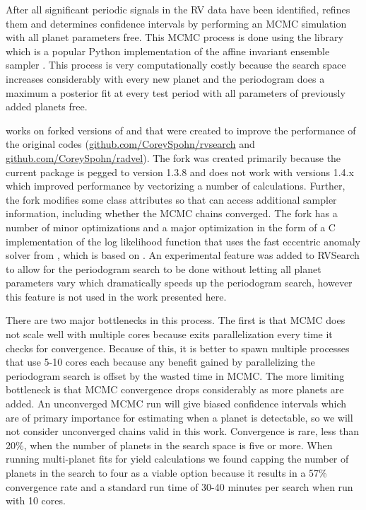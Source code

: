 After all significant periodic signals in the RV data have been identified,
 refines them and determines confidence intervals by performing
an MCMC simulation with all planet parameters free. This MCMC process is done
using the  library \citep{emcee} which is a popular Python
implementation of the affine invariant ensemble sampler \citep{Goodman2010}.
This process is very computationally costly because the search space increases
considerably with every new planet and the periodogram does a maximum a
posterior fit at every test period with all parameters of previously added
planets free.

 works on forked versions of  and
 that were created to improve the performance of the original
codes (\url{github.com/CoreySpohn/rvsearch} and
\url{github.com/CoreySpohn/radvel}). The  fork was created
primarily because the current  package is pegged to
 version 1.3.8 and does not work with  versions 1.4.x
which improved performance by vectorizing a number of calculations. Further,
the fork modifies some class attributes so that  can access
additional sampler information, including whether the MCMC chains converged.
The  fork has a number of minor optimizations and a major
optimization in the form of a C implementation of the log likelihood function
that uses the fast eccentric anomaly solver from 
\citep{brandtOrvaraEfficient2021}, which is based on
\citet{raposo-pulidoEfficientCode2017}. An experimental feature was added to
RVSearch to allow for the periodogram search to be done without letting all
planet parameters vary which dramatically speeds up the periodogram search,
however this feature is not used in the work presented here.

There are two major bottlenecks in this process. The first is that MCMC does
not scale well with multiple cores because  exits parallelization
every time it checks for convergence. Because of this, it is better to spawn
multiple processes that use 5-10 cores each because any benefit gained by
parallelizing the periodogram search is offset by the wasted time in MCMC. The
more limiting bottleneck is that MCMC convergence drops considerably as more
planets are added. An unconverged MCMC run will give biased confidence
intervals which are of primary importance for estimating when a planet is
detectable, so we will not consider unconverged chains valid in this work.
Convergence is rare, less than 20\%, when the number of planets in the search
space is five or more. When running multi-planet fits for yield calculations we
found capping the number of planets in the search to four as a viable option
because it results in a 57\% convergence rate and a standard run time of 30-40
minutes per search when run with 10 cores.

